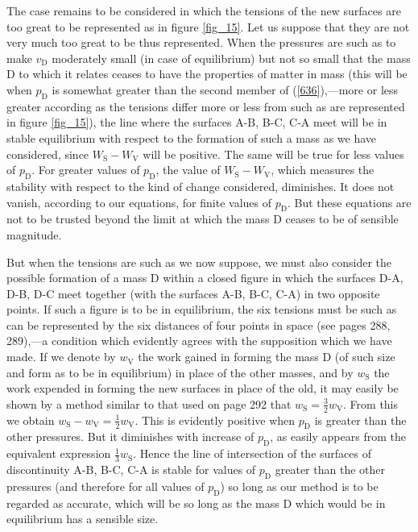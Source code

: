 \documentclass[12pt]{article}
\begin{document}
The case remains to be considered in which the tensions of the new surfaces are too great to be represented as in figure \ref{fig_15}. Let us suppose that they are not very much too great to be thus represented. When the pressures are such as to make $v_\text{D}$ moderately small (in case of equilibrium) but not so small that the mass D to which it relates ceases to have the properties of matter in mass (this will be when $p_\text{D}$ is somewhat greater than the second member of (\ref{636}),---more or less greater according as the tensions differ more or less from such as are represented in figure \ref{fig_15}), the line where the surfaces A-B, B-C, C-A meet will be in stable equilibrium with respect to the formation of such a mass as we have considered, since $W_\text{S}-W_\text{V}$ will be positive. The same will be true for less values of $p_\text{D}$. For greater values of $p_\text{D}$, the value of $W_\text{S}-W_\text{V}$, which measures the stability with respect to the kind of change considered, diminishes. It does not vanish, according to our equations, for finite values of $p_\text{D}$. But these equations are not to be trusted beyond the limit at which the mass D ceases to be of sensible magnitude.

But when the tensions are such as we now suppose, we must also consider the possible formation of a mass D within a closed figure in which the surfaces D-A, D-B, D-C meet together (with the surfaces A-B, B-C, C-A) in two opposite points. If such a figure is to be in equilibrium, the six tensions must be such as can be represented by the six distances of four points in space (see pages 288, 289),---a condition which evidently agrees with the supposition which we have made. If we denote by $w_\text{V}$ the work gained in forming the mass D (of such size and form as to be in equilibrium) in place of the other masses, and by $w_\text{S}$ the work expended in forming the new surfaces in place of the old, it may easily be shown by a method similar to that used on page 292 that $w_\text{S}=\tfrac{3}{2}w_\text{V}$. From  this we obtain $w_\text{S}-w_\text{V} = \tfrac{1}{2}w_\text{V}.$ This is evidently positive when $p_\text{D}$ is greater than the other pressures. But it diminishes with increase of $p_\text{D}$, as easily appears from the equivalent expression $\tfrac{1}{3}w_\text{S}$. Hence the line of intersection of the surfaces of discontinuity A-B, B-C, C-A is stable for values of $p_\text{D}$ greater than the other pressures (and therefore for all values of $p_\text{D}$) so long as our method is to be regarded as accurate, which will be so long as the mass D which would be in equilibrium has a sensible size. 
\end{document}

